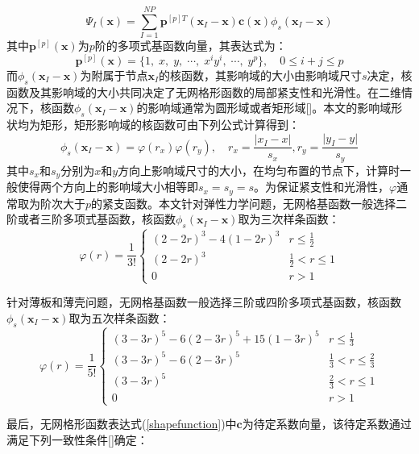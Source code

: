 \begin{equation}\label{shapefunction}
        \Psi_I(\pmb{x})=\sum_{I=1}^{N\!P}\pmb{p}^{[p]T}(\pmb{x}_I-\pmb{x})\pmb{c}(\pmb{x})\phi_s(\pmb{x}_I-\pmb{x})
\end{equation}
其中$\pmb{p}^{[p]}(\pmb{x})$为$p$阶的多项式基函数向量，其表达式为：
\begin{equation}
    \pmb{p}^{[p]}(\pmb{x})=\{1,\;x,\;y,\;\dotsb,\;x^iy^i,\;\dotsb,\;y^p\},\quad 0\le i+j \le p
\end{equation}
而$\phi_s(\pmb{x}_I-\pmb{x})$为附属于节点$\pmb{x}_I$的核函数，其影响域的大小由影响域尺寸$s$决定，核函数及其影响域的大小共同决定了无网格形函数的局部紧支性和光滑性。在二维情况下，核函数$\phi_s(\pmb{x}_I-\pmb{x})$的影响域通常为圆形域或者矩形域[]。本文的影响域形状均为矩形，矩形影响域的核函数可由下列公式计算得到：
\begin{equation}
    \phi_s(\pmb{x}_I-\pmb{x})=\varphi(r_x)\varphi(r_y),\quad r_x=\frac{\lvert x_I-x\rvert}{s_x},r_y=\frac{\lvert y_I-y \rvert}{s_y}
\end{equation}
其中$s_x$和$s_y$分别为$x$和$y$方向上影响域尺寸的大小，在均匀布置的节点下，计算时一般使得两个方向上的影响域大小相等即$s_x=s_y=s$。为保证紧支性和光滑性，$\varphi$通常取为阶次大于$p$的紧支函数。本文针对弹性力学问题，无网格基函数一般选择二阶或者三阶多项式基函数，核函数$\phi_s(\pmb{x}_I-\pmb{x})$取为三次样条函数：
\begin{equation}
    \varphi(r)=\frac{1}{3!}
\begin{cases}
    (2-2r)^3-4(1-2r)^3 &r\le \frac{1}{2}\\
    (2-2r)^3&\frac{1}{2}<r\le 1\\
    0&r>1
\end{cases}
\end{equation}\par
针对薄板和薄壳问题，无网格基函数一般选择三阶或四阶多项式基函数，核函数$\phi_s(\pmb{x}_I-\pmb{x})$取为五次样条函数：
\begin{equation}
        \varphi(r)=\frac{1}{5!}
\begin{cases}
        (3-3r)^5-6(2-3r)^5+15(1-3r)^5&r\le\frac{1}{3}\\
        (3-3r)^5-6(2-3r)^5&\frac{1}{3}<r\le\frac{2}{3}\\
        (3-3r)^5&\frac{2}{3}<r\le1\\
        0&r>1
\end{cases}
\end{equation}\par
最后，无网格形函数表达式(\ref{shapefunction})中$\pmb{c}$为待定系数向量，该待定系数通过满足下列一致性条件[]确定：
